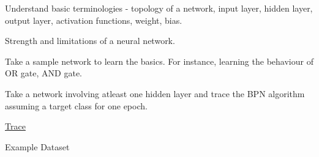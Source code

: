 \documentclass[12pt]{article}
\renewcommand{\_}{\kern-1.5pt\textunderscore\kern-1.5pt}
\begin{document}
\vspace{\baselineskip}
{\fontsize{14pt}{16.8pt}\selectfont Understand basic terminologies - topology of a network, input layer, hidden layer, output layer, activation functions, weight, bias.\par}\par

{\fontsize{14pt}{16.8pt}\selectfont Strength and limitations of a neural network.\par}\par

{\fontsize{14pt}{16.8pt}\selectfont Take a sample network to learn the basics. For instance, learning the behaviour of OR gate, AND gate.\par}\par

{\fontsize{14pt}{16.8pt}\selectfont Take a network involving atleast one hidden layer and trace the BPN algorithm assuming a target class for one epoch.\par}\par


\vspace{\baselineskip}

\vspace{\baselineskip}
{\fontsize{14pt}{16.8pt}\selectfont \uline{Trace}\par}\par

Example Dataset \par



\end{document}
